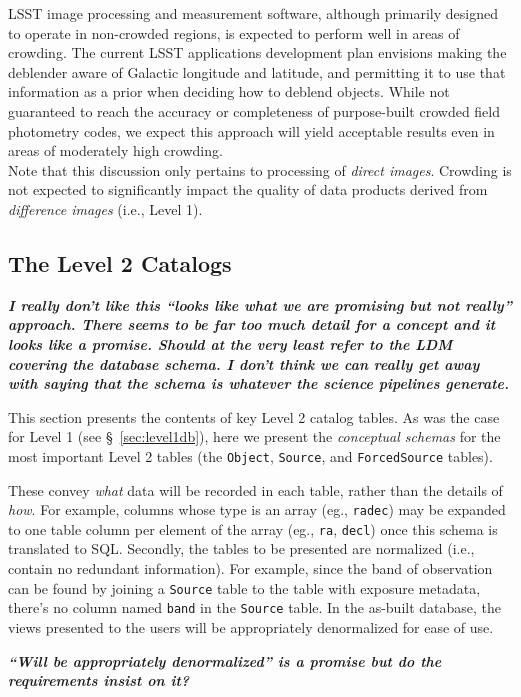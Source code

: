 \documentclass[12pt]{article}
\newcommand{\code}[1]{\texttt{#1}}
\newcommand{\annotate}[1]{{\color{magenta}\large\textbf{\emph{#1}}}}
\newcommand{\Object}{\code{Object}\xspace}
\newcommand{\Source}{\code{Source}\xspace}
\newcommand{\ForcedSource}{\code{ForcedSource}\xspace}
\begin{document}
LSST image processing and measurement software, although primarily designed to operate in non-crowded regions, is expected to perform well in areas of crowding. The current LSST applications development plan envisions making the deblender aware of Galactic longitude and latitude, and permitting it to use that information as a prior when deciding how to deblend objects. While not guaranteed to reach the accuracy or completeness of purpose-built crowded field photometry codes, we expect this approach will yield acceptable results even in areas of moderately high crowding.
\\

Note that this discussion only pertains to processing of {\em direct images}. Crowding is not expected to significantly impact the quality of data products derived from {\em difference images} (i.e., Level 1).

\subsection{The Level 2 Catalogs}

\annotate{I really don't like this ``looks like what we are promising but not really'' approach. There seems to be far too much detail for a concept and it looks like a promise. Should at the very least refer to the LDM covering the database schema. I don't think we can really get away with saying that the schema is whatever the science pipelines generate.}

This section presents the contents of key Level 2 catalog tables. As was the case for Level 1 (see \S~\ref{sec:level1db}), here we present the {\em conceptual schemas} for the most important Level 2 tables (the \Object, \Source, and \ForcedSource tables).

These convey {\em what} data will be recorded in each table, rather than the details of {\em how}. For example, columns whose type is an array (eg., \texttt{radec}) may be expanded to one table column per element of the array (eg., \texttt{ra}, \texttt{decl}) once this schema is translated to SQL. Secondly, the tables to be presented are normalized (i.e., contain no redundant information). For example, since the band of observation can be found by joining a \Source table to the table with exposure metadata, there's no column named {\tt band} in the \Source table. In the as-built database, the views presented to the users will be appropriately denormalized for ease of use.

\annotate{``Will be appropriately denormalized'' is a promise but do the requirements insist on it?}
\end{document}
